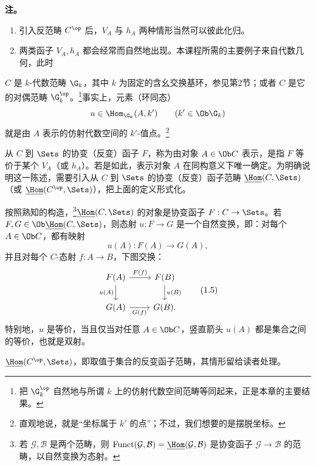 \textbf{注。}
\begin{enumerate}[label=\arabic*)]
\item 引入反范畴 $C^{\op}$ 后，$V_A$ 与 $h_A$ 两种情形当然可以彼此化归。
\item 两类函子 $V_A,h_A$ 都会经常而自然地出现。本课程所需的主要例子来自代数几何，此时
\end{enumerate}

$C$ 是 $k$-代数范畴 $\G_k$，其中 $k$ 为固定的含幺交换基环，参见第2节；或者 $C$ 是它的对偶范畴 $\G_k^{\op}$。\footnote{把 $\G_k^{\op}$ 自然地与所谓 $k$ 上的仿射代数空间范畴等同起来，正是本章的主要结果。}事实上，元素（环同态）
\[
u\in\Hom_{\G_k}(A,k')\qquad(k'\in\Ob\G_k)
\]
就是由 $A$ 表示的仿射代数空间的 $k'$-值点。\footnote{直观地说，就是“坐标属于 $k'$ 的点”；不过，我们想要的是摆脱坐标。}

从 $C$ 到 $\Sets$ 的协变（反变）函子 $F$，称为由对象 $A\in\Ob C$ 表示，是指 $F$ 等价于某个 $V_A$（或 $h_A$）。若是如此，表示对象 $A$ 在同构意义下唯一确定。为明确说明这一陈述，需要引入从 $C$ 到 $\Sets$ 的协变（反变）函子范畴 $\underline{\Hom}(C,\Sets)$（或 $\underline{\Hom}(C^{\op},\Sets)$），把上面的定义形式化。

按照熟知的构造，\footnote{若 $\mathcal G,\mathcal B$ 是两个范畴，则 $\operatorname{Funct}(\mathcal G,\mathcal B)=\underline{\Hom}(\mathcal G,\mathcal B)$ 是协变函子 $\mathcal G\to\mathcal B$ 的范畴，以自然变换为态射。}$\underline{\Hom}(C,\Sets)$ 的对象是协变函子 $F:C\to\Sets$。若 $F,G\in\Ob\underline{\Hom}(C,\Sets)$，则态射 $u:F\to G$ 是一个自然变换，即：对每个 $A\in\Ob C$，都有映射
\[
u(A):F(A)\longrightarrow G(A),
\]
并且对每个 $C$-态射 $f:A\to B$，下图交换：
\[
\begin{tikzcd}[ampersand replacement=\&]
F(A)\arrow[r,"F(f)"]\arrow[d,"u(A)"']\&F(B)\arrow[d,"u(B)"]\\
G(A)\arrow[r,"G(f)"']\&G(B).
\end{tikzcd}\tag{1.5}
\]
特别地，$u$ 是等价，当且仅当对任意 $A\in\Ob C$，竖直箭头 $u(A)$ 都是集合之间的等价，也就是双射。

$\underline{\Hom}(C^{\op},\Sets)$，即取值于集合的反变函子范畴，其情形留给读者处理。

